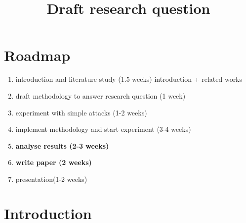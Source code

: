\documentclass[11pt]{article}
\title{\textbf{Draft research question}}
\begin{document}
\maketitle

\section{Roadmap}

\begin{enumerate}
  \item introduction and literature study (1.5 weeks) introduction + related works
  \item draft methodology to answer research question (1 week)
  \item experiment with simple attacks (1-2 weeks)
  \item implement methodology and start experiment (3-4 weeks)
  \item \textbf{analyse results (2-3 weeks)}
  \item \textbf{write paper (2 weeks)}
  \item presentation(1-2 weeks)
\end{enumerate}

\section{Introduction}
\end{document}

